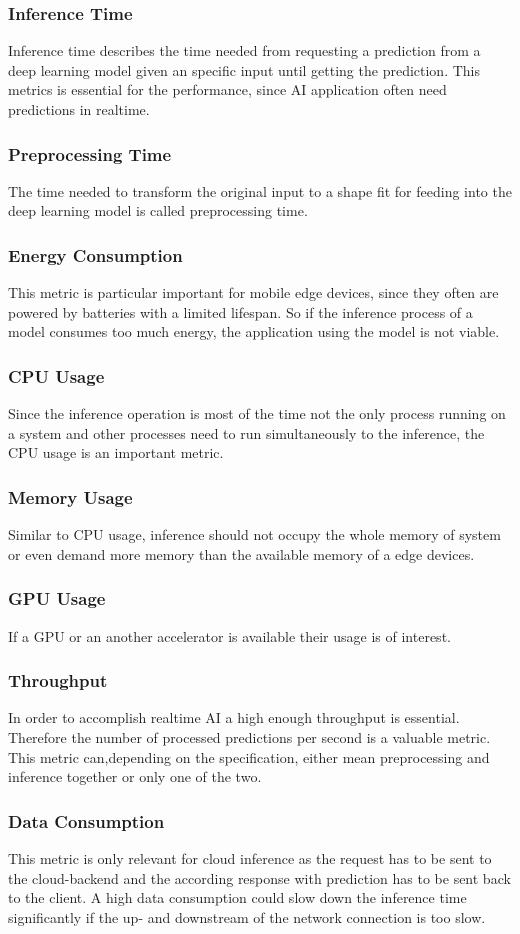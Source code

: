 \subsubsection{Inference Time}
Inference time describes the time needed from requesting a prediction from a deep learning model given an specific input until getting the prediction.
This metrics is essential for the performance, since AI application often need predictions in realtime.
\subsubsection{Preprocessing Time}
The time needed to transform the original input to a shape fit for feeding into the deep learning model is called preprocessing time.
\subsubsection{Energy Consumption}
This metric is particular important for mobile edge devices, since they often are powered by batteries with a limited lifespan. So if the inference process of a model consumes too much energy, the application using the model is not viable.
\subsubsection{CPU Usage}
Since the inference operation is most of the time not the only process running on a system and other processes need to run simultaneously to the inference, the CPU usage is an important metric.
\subsubsection{Memory Usage}
Similar to CPU usage, inference should not occupy the whole memory of system or even demand more memory than the available memory of a edge devices.
\subsubsection{GPU Usage}
If a GPU or an another accelerator is available their usage is of interest.
\subsubsection{Throughput}
In order to accomplish realtime AI a high enough throughput is essential. Therefore the number of processed predictions per second is a valuable metric. This metric can,depending on the specification, either mean preprocessing and inference together or only one of the two.
\subsubsection{Data Consumption}
This metric is only relevant for cloud inference as the request has to be sent to the cloud-backend and the according response with prediction has to be sent back to the client. A high data consumption could slow down the inference time significantly if the up- and downstream of the network connection is too slow. 

\endinput 